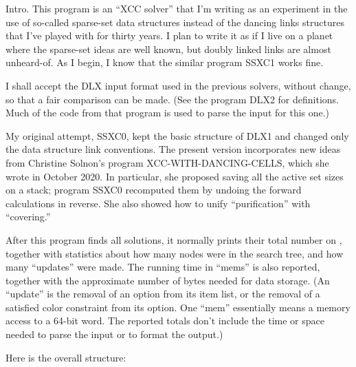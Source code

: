 
\datethis

Intro. This program is an ``{\mc XCC} solver'' that I'm writing
as an experiment in the use of so-called sparse-set data structures
instead of the dancing links structures that I've played with for thirty years.
I plan to write it as if I live on a planet where the sparse-set
ideas are well known, but doubly linked links are almost unheard-of.
As I begin, I know that the similar program {\mc SSXC1} works fine.

I shall accept the {\mc DLX} input format used in the previous solvers,
without change, so that a fair comparison can be made.
(See the program {\mc DLX2} for definitions. Much of the code from
that program is used to parse the input for this one.)

My original attempt, {\mc SSXC0}, kept the basic structure of {\mc DLX1}
and changed only the data structure link conventions. The present
version incorporates new ideas from Christine Solnon's
program {\mc XCC-WITH-DANCING-CELLS}, which she wrote in October 2020.
In particular, she proposed saving all the active set sizes on a stack;
program {\mc SSXC0} recomputed them by undoing the forward calculations
in reverse. She also showed how to unify ``purification'' with ``covering.''

\fi

After this program finds all solutions, it normally prints their total
number on , together with statistics about how many
nodes were in the search tree, and how many ``updates'' were made.
The running time in ``mems'' is also reported, together with the approximate
number of bytes needed for data storage.
(An ``update'' is the removal of an option from its item list,
or the removal of a satisfied color constraint from its option.
One ``mem'' essentially means a memory access to a 64-bit word.
The reported totals don't include the time or space needed to parse the
input or to format the output.)

Here is the overall structure:

